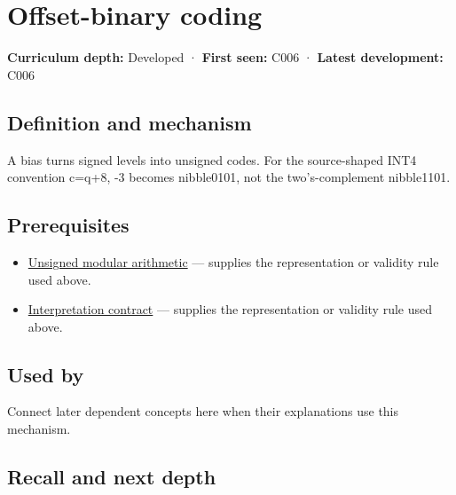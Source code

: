 \hypertarget{appendix-53a8cfb25f8d}{}\label{referencestart:appendix-53a8cfb25f8d}
\section{Offset-binary coding}\label{appendix-53a8cfb25f8d-offset-binary-coding}

\textbf{Curriculum depth:} Developed · \textbf{First seen:} C006 · \textbf{Latest development:} C006

\begin{allmightroledefinition}

\subsection{Definition and mechanism}\label{appendix-53a8cfb25f8d-definition-and-mechanism}

A bias turns signed levels into unsigned codes. For the source-shaped INT4 convention c=q+8, -3 becomes nibble0101, not the two's-complement nibble1101.

\end{allmightroledefinition}

\subsection{Prerequisites}\label{appendix-53a8cfb25f8d-prerequisites}

\begin{itemize}
\tightlist
\item
  \hyperref[appendix-c99977d88b33]{Unsigned modular arithmetic} --- supplies the representation or validity rule used above.
\item
  \hyperref[appendix-f414bd4ed05c]{Interpretation contract} --- supplies the representation or validity rule used above.
\end{itemize}

\subsection{Used by}\label{appendix-53a8cfb25f8d-used-by}

Connect later dependent concepts here when their explanations use this mechanism.

\subsection{Recall and next depth}\label{appendix-53a8cfb25f8d-recall-and-next-depth}

